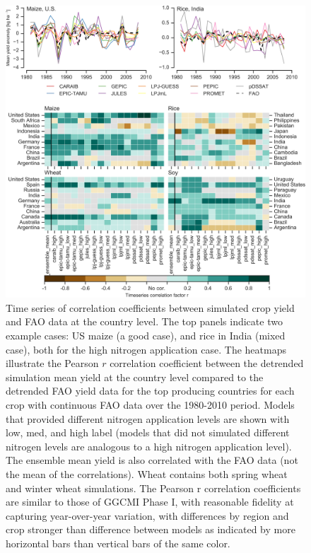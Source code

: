 \documentclass[esd, final]{copernicus} %
\begin{document}
\begin{figure}[t]
    \centering
    \includegraphics[width=16cm]{figures/Agformet_validation.png}
    \caption{Time series of correlation coefficients between simulated crop yield and FAO data \citep{FAOSTAT} at the country level. The top panels indicate two example cases: US maize (a good case), and rice in India (mixed case), both for the high nitrogen application case. The heatmaps illustrate the Pearson $r$ correlation coefficient between the detrended simulation mean yield at the country level compared to the detrended FAO yield data for the top producing countries for each crop with continuous FAO data over the 1980-2010 period. Models that provided different nitrogen application levels are shown with low, med, and high label (models that did not simulated different nitrogen levels are analogous to a high nitrogen application level). The ensemble mean yield is also correlated with the FAO data (not the mean of the correlations). Wheat contains both spring wheat and winter wheat simulations. The Pearson r correlation coefficients are similar to those of GGCMI Phase I, with reasonable fidelity at capturing year-over-year variation, with differences by region and crop stronger than difference between models as indicated by more horizontal bars than vertical bars of the same color.}
    \label{fig:simulation_val}
\end{figure}
\end{document}
